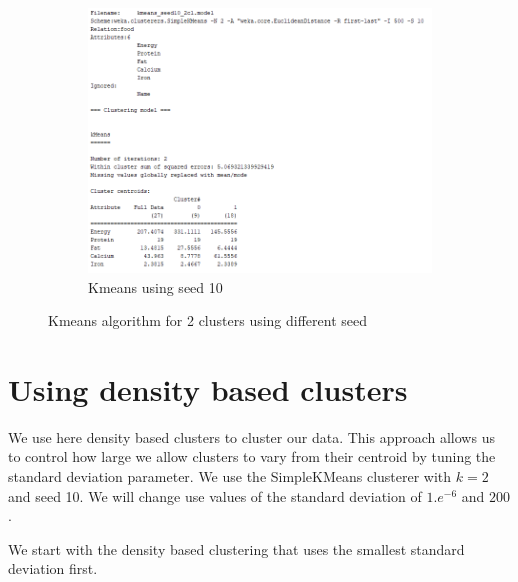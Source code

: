 \documentclass[letterpaper,12pt]{article}
\begin{document}
\begin{figure}[H]
\begin{subfigure}{.4\textwidth}
  \centering
  \includegraphics[width=.8\linewidth]{kmeans_seed10_2cl_output}  
  \caption{Kmeans using seed 10}
  \label{fig:sub-third_2}
\end{subfigure}
\caption{Kmeans algorithm for 2 clusters using different seed}
\label{fig:fig_2}
\end{figure}




\section{Using density based clusters}

We use here density based clusters to cluster our data. This approach allows us to control how large we allow clusters to vary from their centroid by tuning the standard deviation parameter. We use the SimpleKMeans clusterer with $k = 2$ and seed 10. We will change use values of the standard deviation of $1.e^{-6}$ and $200$.

We start with the density based clustering that uses the smallest standard deviation first.
\end{document}
